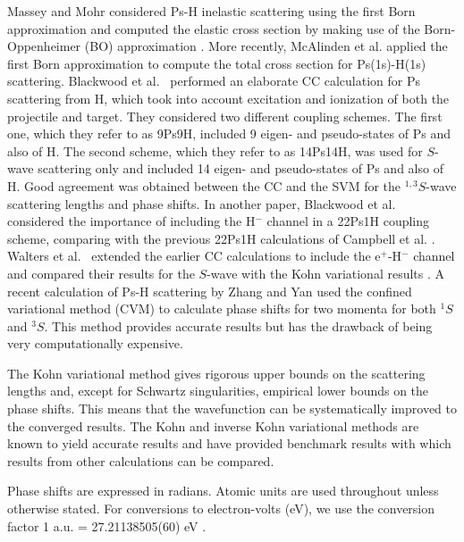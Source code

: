 \documentclass[preprint,showpacs,showkeys,preprintnumbers,amsmath,amssymb,longbibliography,pra,aps]{revtex4-1}
\begin{document}
Massey and Mohr \cite{Massey1954} considered Ps-H inelastic scattering using the first Born
approximation and computed the elastic cross section by making use of the
Born-Oppenheimer (BO) approximation
\cite{Massey1954,Oppenheimer1928,Geltman1969,Mott1965}.
More recently, McAlinden et al. \cite{McAlinden1996}
applied the first Born approximation to compute the total cross section for
Ps(1s)-H(1s) scattering.
Blackwood et al.~\cite{Blackwood2002} performed an elaborate CC calculation 
for Ps scattering from H, which took into account excitation and ionization 
of both the projectile and target. They considered two different coupling 
schemes. The first one, which they refer to as 9Ps9H, included 9 eigen- and 
pseudo-states of Ps and also of H. The second scheme, which they refer to as 
14Ps14H, was used for $S$-wave scattering only and included
14 eigen- and pseudo-states of 
Ps and also of H. Good agreement was obtained between the CC
\cite{Blackwood2002} and the SVM \cite{Ivanov2002} for the $^{1,3}S$-wave scattering
lengths and phase shifts. In another paper, Blackwood et
al.~\cite{Blackwood2002b} considered the importance of including the H$^-$
channel in a 22Ps1H coupling scheme, comparing with the previous 22Ps1H
calculations of Campbell et al. \cite{Campbell1998}. Walters et
al.~\cite{Walters2004} extended the earlier CC calculations
\cite{Blackwood2002} to include the e$^+$-H$^-$ channel
\cite{Blackwood2002b} and compared their results for the $S$-wave with the
Kohn variational results \cite{VanReeth2003}.
A recent calculation of Ps-H scattering by Zhang and Yan
\cite{Zhang2012} used the
confined variational method (CVM) to calculate phase shifts for two momenta
for both $^1S$ and $^3S$. This method provides accurate
results but has the drawback of being very computationally expensive.

The Kohn variational method gives rigorous upper bounds on the scattering lengths
and, except for Schwartz singularities, empirical lower bounds on the
phase shifts. This means that the wavefunction can be systematically improved
to the converged results. The Kohn and inverse Kohn
variational methods are known to yield accurate results and have provided 
benchmark results \cite{VanReeth2003,VanReeth2004} with which results from 
other calculations can be compared.

Phase shifts are expressed in radians. Atomic units are used throughout 
unless otherwise stated. For conversions to electron-volts (eV), we use the 
conversion factor 1 a.u. = {27.21138505(60) eV}
\cite{Mohr2012,*NISTConversions}.
\end{document}
